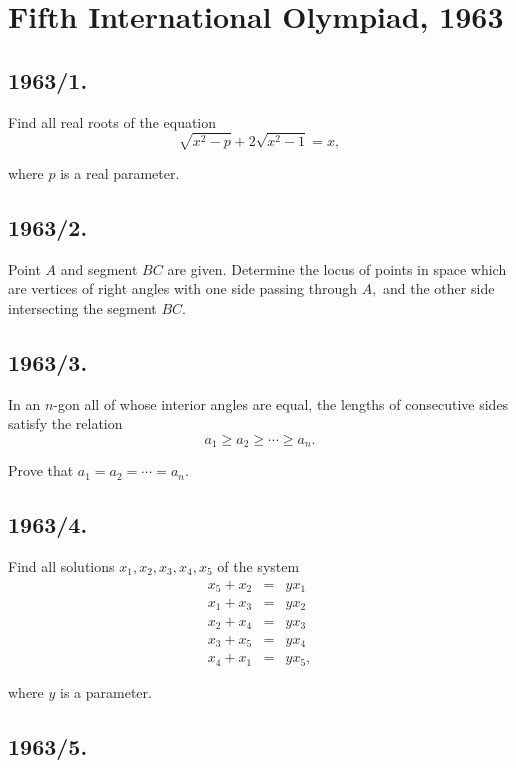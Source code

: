 \documentclass[12pt,thmsa]{article}
\begin{document}
\section{Fifth International Olympiad, 1963}

\subsection{1963/1.}

Find all real roots of the equation
\[
\sqrt{x^{2}-p}+2\sqrt{x^{2}-1}=x,
\]

where $p$ is a real parameter.

\subsection{1963/2.}

Point $A$ and segment $BC$ are given. Determine the locus of points in space
which are vertices of right angles with one side passing through $A,$ and
the other side intersecting the segment $BC.$

\subsection{1963/3.}

In an $n$-gon all of whose interior angles are equal, the lengths of
consecutive sides satisfy the relation
\[
a_{1}\geq a_{2}\geq \cdots \geq a_{n}.
\]

Prove that $a_{1}=a_{2}=\cdots =a_{n}.$

\subsection{1963/4.}

Find all solutions $x_{1},x_{2},x_{3},x_{4},x_{5}$ of the system
\begin{eqnarray*}
x_{5}+x_{2} &=&yx_{1} \\
x_{1}+x_{3} &=&yx_{2} \\
x_{2}+x_{4} &=&yx_{3} \\
x_{3}+x_{5} &=&yx_{4} \\
x_{4}+x_{1} &=&yx_{5},
\end{eqnarray*}

where $y$ is a parameter.

\subsection{1963/5.}
\end{document}
